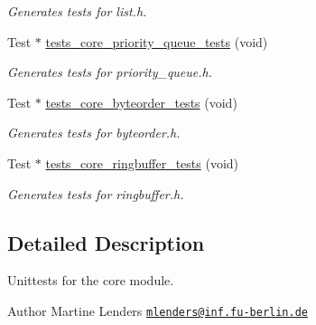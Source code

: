 \begin{DoxyCompactItemize}
\begin{DoxyCompactList}\small\item\em Generates tests for list.\+h. \end{DoxyCompactList}\item 
Test $\ast$ \hyperlink{group__unittests_ga5f7e66228b199fc4a8938d67b5bfbdce}{tests\+\_\+core\+\_\+priority\+\_\+queue\+\_\+tests} (void)
\begin{DoxyCompactList}\small\item\em Generates tests for priority\+\_\+queue.\+h. \end{DoxyCompactList}\item 
Test $\ast$ \hyperlink{group__unittests_ga664f87f90c88e1bb9d124238e01076d1}{tests\+\_\+core\+\_\+byteorder\+\_\+tests} (void)
\begin{DoxyCompactList}\small\item\em Generates tests for byteorder.\+h. \end{DoxyCompactList}\item 
Test $\ast$ \hyperlink{group__unittests_gafd9d608a22f7a35a7c85501b68bb0baf}{tests\+\_\+core\+\_\+ringbuffer\+\_\+tests} (void)
\begin{DoxyCompactList}\small\item\em Generates tests for ringbuffer.\+h. \end{DoxyCompactList}\end{DoxyCompactItemize}


\subsection{Detailed Description}
Unittests for the {\ttfamily core} module. 

\begin{DoxyAuthor}{Author}
Martine Lenders \href{mailto:mlenders@inf.fu-berlin.de}{\tt mlenders@inf.\+fu-\/berlin.\+de} 
\end{DoxyAuthor}
